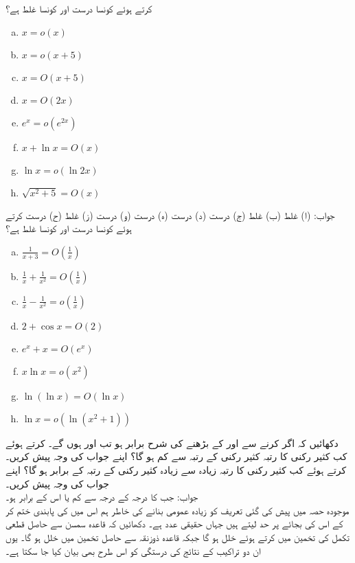  کرتے ہوئے کونسا درست اور کونسا غلط ہے؟
\begin{multicols}{3}
\begin{enumerate}[a.]
\item
$x=o(x)$
\item
$x=o(x+5)$
\item
$x=O(x+5)$
\item
$x=O(2x)$
\item
$e^x=o(e^{2x})$
\item
$x+\ln x=O(x)$
\item
$\ln x=o(\ln 2x)$
\item
$\sqrt{x^2+5}=O(x)$
\end{enumerate}
\end{multicols}
جواب:\quad
(ا) غلط (ب) غلط (ج) درست (د) درست (ہ) درست (و) درست (ز) غلط (ح) درست
 کرتے ہوئے کونسا درست اور کونسا غلط ہے؟
\begin{multicols}{3}
\begin{enumerate}[a.]
\item
$\frac{1}{x+3}=O(\tfrac{1}{x})$
\item
$\frac{1}{x}+\frac{1}{x^2}=O(\tfrac{1}{x})$
\item
$\frac{1}{x}-\frac{1}{x^2}=o(\tfrac{1}{x})$
\item
$2+\cos x=O(2)$
\item
$e^x+x=O(e^x)$
\item
$x\ln x=o(x^2)$
\item
$\ln(\ln x)=O(\ln x)$
\item
$\ln x=o(\ln(x^2+1))$
\end{enumerate}
\end{multicols}
دکھائیں کہ اگر  کرنے سے  اور  کے بڑھنے کی شرح برابر ہو تب  اور  ہوں گے۔
 کرتے ہوئے کب کثیر رکنی  کا رتبہ کثیر رکنی  کے رتبہ سے کم ہو گا؟ اپنے جواب کی وجہ پیش کریں۔
 کرتے ہوئے کب کثیر رکنی  کا رتبہ زیادہ سے زیادہ کثیر رکنی  کے رتبہ کے برابر ہو گا؟ اپنے جواب کی وجہ پیش
 کریں۔\\
جواب:\quad
جب  کا درجہ  کے درجہ سے کم یا اس کے برابر ہو۔
\\
موجودہ حصہ میں پیش کی گئی تعریف کو زیادہ عمومی بنانے کی خاطر ہم اس میں  کی پابندی ختم کر کے اس  کی بجائے  پر حد لیتے ہیں جہاں  حقیقی عدد ہے۔ دکھائیں کہ قاعدہ سمسن سے حاصل قطعی تکمل کی تخمین میں  کرتے ہوئے خلل  ہو گا جبکہ قاعدہ ذوزنقہ سے حاصل تخمین میں خلل  ہو گا۔ یوں ان دو تراکیب کے نتائج کی درستگی کو اس طرح بھی بیان کیا جا سکتا ہے۔  

